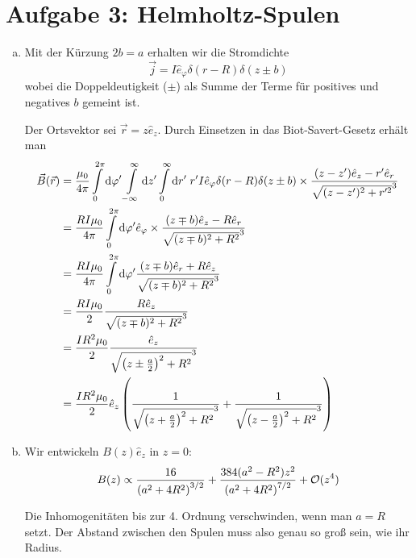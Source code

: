 \documentclass[a4paper,german,12pt,smallheadings]{scrartcl}
\begin{document}
\section*{Aufgabe 3: Helmholtz-Spulen}
\begin{enumerate}[a)]
  \item
    Mit der Kürzung $2b = a$ erhalten wir die Stromdichte
    \begin{equation}
      \vec{j} = I \hat{e}_\varphi \delta(r-R) \delta(z \pm b)
    \end{equation}
    wobei die Doppeldeutigkeit ($\pm$) als Summe der Terme für positives und
    negatives $b$ gemeint ist.

    Der Ortsvektor sei $\vec{r} = z \hat{e}_z$. Durch Einsetzen in das
    Biot-Savert-Gesetz erhält man
    \begin{align*}
      \vec{B}(\vec{r})
      &= \frac{\mu_0}{4 \pi}
      \int\limits_0^{2 \pi} \dif \varphi'
      \int\limits_{-\infty}^{\infty} \dif z'
      \int\limits_{0}^{\infty} \dif r' \;
      r'
      I \hat{e}_\varphi \delta(r-R) \delta(z \pm b) \times
      \frac{
        (z - z') \hat{e}_z - r'\hat{e}_r
      }{
        \sqrt{
          (z-z')^2 + r'^2
        }^3
      } \\
      &= \frac{R I \mu_0}{4 \pi}
      \int\limits_0^{2 \pi} \dif \varphi'
      \hat{e}_\varphi \times
      \frac{
        (z \mp b) \hat{e}_z - R\hat{e}_r
      }{
        \sqrt{
          (z \mp b)^2 + R^2
        }^3
      } \\
      &= \frac{RI \mu_0}{4 \pi}
      \int\limits_0^{2 \pi} \dif \varphi'
      \frac{
        (z \mp b) \hat{e}_r
        + R \hat{e}_z
      }{
        \sqrt{
          (z \mp b)^2 + R^2
        }^3
      } \\
      &= \frac{RI \mu_0}{2}
      \frac{
        R \hat{e}_z
      }{
        \sqrt{
          (z \mp b)^2 + R^2
        }^3
      } \\
      &= \frac{I R^2 \mu_0}{2}
      \frac{
        \hat{e}_z
      }{
        \sqrt{
          \del{z \pm \frac{a}{2}}^2 + R^2
        }^3
      } \\
      &= \frac{I R^2 \mu_0}{2} \hat{e}_z \del{
        \frac{
          1
        }{
          \sqrt{
            \del{z + \frac{a}{2}}^2 + R^2
          }^3
        }
        +
        \frac{
          1
        }{
          \sqrt{
            \del{z - \frac{a}{2}}^2 + R^2
          }^3
        }
      }
    \end{align*}
  \item
    Wir entwickeln $B(z) \hat{e}_z$ in $z=0$:
    \begin{equation}
      B(z) \propto
      \frac{16}{\del{a^2 + 4R^2}^{3/2}} +
      \frac{384 (a^2-R^2)z^2}{\del{a^2+4R^2}^{7/2}}
      + \mathcal{O}(z^4)
    \end{equation}

    Die Inhomogenitäten bis zur 4. Ordnung verschwinden, wenn man $a=R$ setzt.
    Der Abstand zwischen den Spulen muss also genau so groß sein, wie ihr Radius.
\end{enumerate}
\end{document}
